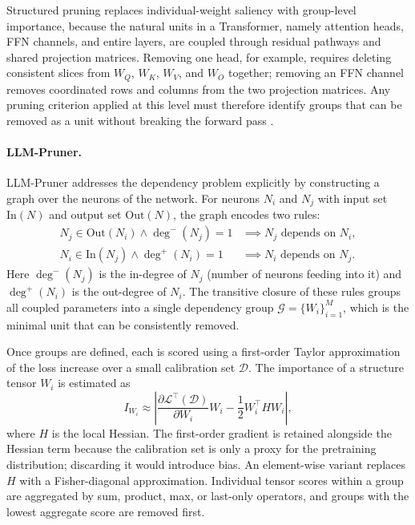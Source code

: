 Structured pruning replaces individual-weight saliency with group-level importance, because the natural units in a Transformer, namely attention heads, FFN channels, and entire layers, are coupled through residual pathways and shared projection matrices. Removing one head, for example, requires deleting consistent slices from $W_Q$, $W_K$, $W_V$, and $W_O$ together; removing an FFN channel removes coordinated rows and columns from the two projection matrices. Any pruning criterion applied at this level must therefore identify groups that can be removed as a unit without breaking the forward pass \cite{michel2022not,kurtic2022optimal}.

\paragraph{LLM-Pruner.}
LLM-Pruner \cite{ma2023llmpruner} addresses the dependency problem explicitly by constructing a graph over the neurons of the network. For neurons $N_i$ and $N_j$ with input set $\mathrm{In}(N)$ and output set $\mathrm{Out}(N)$, the graph encodes two rules:
\begin{align}
	N_j \in \mathrm{Out}(N_i) \wedge \deg^{-}(N_j)=1 &\implies N_j \text{ depends on } N_i, \label{eq:dep1}\\
	N_i \in \mathrm{In}(N_j) \wedge \deg^{+}(N_i)=1 &\implies N_i \text{ depends on } N_j. \label{eq:dep2}
\end{align}
Here $\deg^{-}(N_j)$ is the in-degree of $N_j$ (number of neurons feeding into it) and $\deg^{+}(N_i)$ is the out-degree of $N_i$. The transitive closure of these rules groups all coupled parameters into a single dependency group $\mathcal{G} = \{W_i\}_{i=1}^M$, which is the minimal unit that can be consistently removed.

Once groups are defined, each is scored using a first-order Taylor approximation of the loss increase over a small calibration set $\mathcal{D}$. The importance of a structure tensor $W_i$ is estimated as
\begin{equation}
	I_{W_i}
	\approx
	\left|
	\frac{\partial \mathcal{L}^{\top}(\mathcal{D})}{\partial W_i}W_i
	-\frac{1}{2}W_i^{\top}HW_i
	\right|,
	\label{eq:taylor-vector}
\end{equation}
where $H$ is the local Hessian. The first-order gradient is retained alongside the Hessian term because the calibration set is only a proxy for the pretraining distribution; discarding it would introduce bias. An element-wise variant replaces $H$ with a Fisher-diagonal approximation. Individual tensor scores within a group are aggregated by sum, product, max, or last-only operators, and groups with the lowest aggregate score are removed first.

